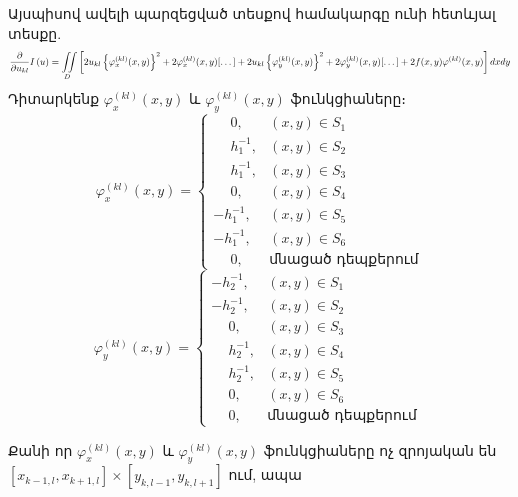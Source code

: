 \documentclass[fleqn, bachelor,subf,12pt,notitlepage]{article}
\newcommand\scalemath[2]{\scalebox{#1}{\mbox{\ensuremath{\displaystyle #2}}}}
\begin{document}
Այսպիսով ավելի պարզեցված տեսքով համակարգը ունի հետևյալ տեսքը.
$$\scalemath{0.75}{\frac{\partial}{\partial u_{kl}}I \left(u\right)= \iint \limits_{D} \left[2u_{kl}\left\{\varphi_{x}^{(kl)}(x,y)\right\}^{2} + 2\varphi_{x}^{(kl)}(x,y)[\dots] + 2u_{kl}\left\{\varphi_{y}^{(kl)}(x,y)\right\}^{2} + 2\varphi_{y}^{(kl)}(x,y)[\dots] + 2f(x,y)\varphi^{(kl)}(x,y)\right]dxdy}$$
Դիտարկենք $\varphi_{x}^{(kl)}(x,y) $ և $\varphi_{y}^{(kl)}(x,y) $ ֆունկցիաները։
\begin{equation}
\varphi_{x}^{(kl)}(x,y)  = \begin{cases}
\phantom{-}0, &(x,y) \in S_{1} \\
\phantom{-}h_{1}^{-1}, &(x,y) \in S_{2} \\
\phantom{-}h_{1}^{-1}, &(x,y) \in S_{3} \\
\phantom{-}0, &(x,y) \in S_{4} \\
-h_{1}^{-1}, &(x,y) \in S_{5} \\
-h_{1}^{-1}, &(x,y) \in S_{6}\\
\phantom{-}0, &\text{մնացած դեպքերում}
\end{cases}
\end{equation}
\begin{equation}
\varphi_{y}^{(kl)}(x,y)  = \begin{cases}
-h_{2}^{-1}, &(x,y) \in S_{1} \\
-h_{2}^{-1}, &(x,y) \in S_{2} \\
\phantom{-}0, &(x,y) \in S_{3} \\
\phantom{-}h_{2}^{-1}, &(x,y) \in S_{4} \\
\phantom{-}h_{2}^{-1}, &(x,y) \in S_{5} \\
\phantom{-}0, &(x,y) \in S_{6}\\
\phantom{-}0, &\text{մնացած դեպքերում}
\end{cases} \;
\end{equation}

Քանի որ $\varphi_{x}^{(kl)}(x,y) $ և $\varphi_{y}^{(kl)}(x,y) $ ֆունկցիաները ոչ զրոյական են $\left[x_{k-1, l}, x_{k+1, l} \right] \times \left[y_{k, l-1}, y_{k, l+1}\right]$ ում, ապա
\end{document}
